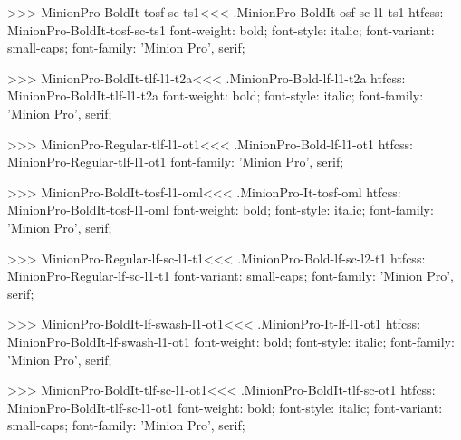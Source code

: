 {>>>
\<MinionPro-BoldIt-tosf-sc-ts1\><<<
.MinionPro-BoldIt-osf-sc-l1-ts1
htfcss:  MinionPro-BoldIt-tosf-sc-ts1  font-weight: bold; font-style: italic; font-variant: small-caps; font-family: 'Minion Pro', serif;

>>>
\<MinionPro-BoldIt-tlf-l1-t2a\><<<
.MinionPro-Bold-lf-l1-t2a
htfcss:  MinionPro-BoldIt-tlf-l1-t2a  font-weight: bold; font-style: italic; font-family: 'Minion Pro', serif;

>>>
\<MinionPro-Regular-tlf-l1-ot1\><<<
.MinionPro-Bold-lf-l1-ot1
htfcss:  MinionPro-Regular-tlf-l1-ot1  font-family: 'Minion Pro', serif;

>>>
\<MinionPro-BoldIt-tosf-l1-oml\><<<
.MinionPro-It-tosf-oml
htfcss:  MinionPro-BoldIt-tosf-l1-oml  font-weight: bold; font-style: italic; font-family: 'Minion Pro', serif;

>>>
\<MinionPro-Regular-lf-sc-l1-t1\><<<
.MinionPro-Bold-lf-sc-l2-t1
htfcss:  MinionPro-Regular-lf-sc-l1-t1  font-variant: small-caps; font-family: 'Minion Pro', serif;

>>>
\<MinionPro-BoldIt-lf-swash-l1-ot1\><<<
.MinionPro-It-lf-l1-ot1
htfcss:  MinionPro-BoldIt-lf-swash-l1-ot1  font-weight: bold; font-style: italic; font-family: 'Minion Pro', serif;

>>>
\<MinionPro-BoldIt-tlf-sc-l1-ot1\><<<
.MinionPro-BoldIt-tlf-sc-ot1
htfcss:  MinionPro-BoldIt-tlf-sc-l1-ot1  font-weight: bold; font-style: italic; font-variant: small-caps; font-family: 'Minion Pro', serif;

}
